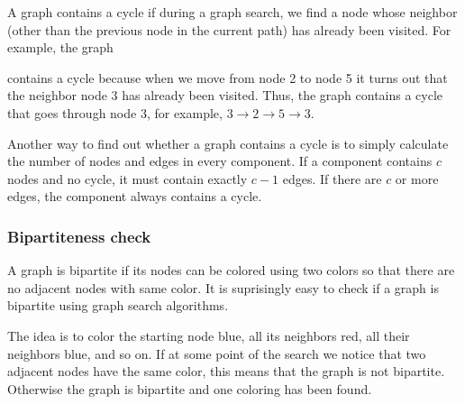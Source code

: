 A graph contains a cycle if during a graph search,
we find a node whose neighbor (other than the
previous node in the current path) has already been
visited.
For example, the graph
\begin{center}
\end{center}
contains a cycle because when we move from
node 2 to node 5 it turns out
that the neighbor node 3 has already been visited.
Thus, the graph contains a cycle that goes through node 3,
for example, $3 \rightarrow 2 \rightarrow 5 \rightarrow 3$.

Another way to find out whether a graph contains a cycle
is to simply calculate the number of nodes and edges
in every component.
If a component contains $c$ nodes and no cycle,
it must contain exactly $c-1$ edges.
If there are $c$ or more edges, the component
always contains a cycle.

\subsubsection{Bipartiteness check}


A graph is bipartite if its nodes can be colored
using two colors so that there are no adjacent
nodes with same color.
It is suprisingly easy to check if a graph
is bipartite using graph search algorithms.

The idea is to color the starting node blue,
all its neighbors red, all their neighbors blue, and so on.
If at some point of the search we notice that
two adjacent nodes have the same color,
this means that the graph is not bipartite.
Otherwise the graph is bipartite and one coloring
has been found.

